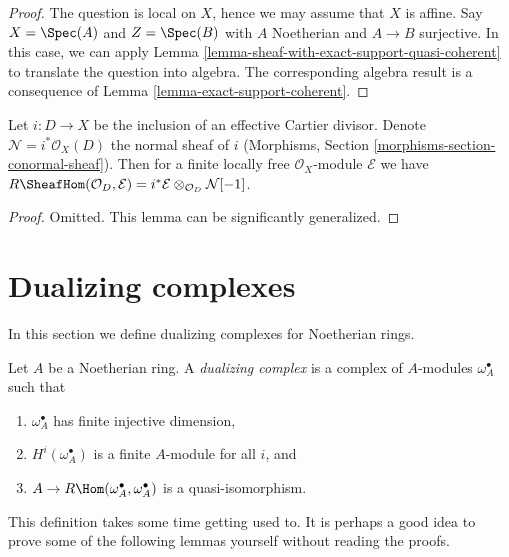 \begin{proof}
The question is local on $X$, hence we may assume that $X$ is affine.
Say $X = \Spec(A)$ and $Z = \Spec(B)$ with $A$ Noetherian and
$A \to B$ surjective. In this case, we can apply
Lemma \ref{lemma-sheaf-with-exact-support-quasi-coherent}
to translate the question into algebra.
The corresponding algebra result is a consequence of
Lemma \ref{lemma-exact-support-coherent}.
\end{proof}

\begin{lemma}
\label{lemma-sheaf-with-exact-support-effective-Cartier}
Let $i : D \to X$ be the inclusion of an effective Cartier divisor.
Denote $\mathcal{N} = i^*\mathcal{O}_X(D)$ the normal sheaf of $i$
(Morphisms, Section \ref{morphisms-section-conormal-sheaf}).
Then for a finite locally free $\mathcal{O}_X$-module $\mathcal{E}$
we have $R\SheafHom(\mathcal{O}_D, \mathcal{E}) =
i^*\mathcal{E} \otimes_{\mathcal{O}_D} \mathcal{N}[-1]$.
\end{lemma}

\begin{proof}
Omitted. This lemma can be significantly generalized.
\end{proof}






\section{Dualizing complexes}
\label{section-dualizing}

\noindent
In this section we define dualizing complexes for Noetherian rings.

\begin{definition}
\label{definition-dualizing}
Let $A$ be a Noetherian ring. A {\it dualizing complex} is a
complex of $A$-modules $\omega_A^\bullet$ such that
\begin{enumerate}
\item $\omega_A^\bullet$ has finite injective dimension,
\item $H^i(\omega_A^\bullet)$ is a finite $A$-module for all $i$, and
\item $A \to R\Hom(\omega_A^\bullet, \omega_A^\bullet)$
is a quasi-isomorphism.
\end{enumerate}
\end{definition}

\noindent
This definition takes some time getting used to. It is perhaps a good
idea to prove some of the following lemmas yourself without reading
the proofs.

